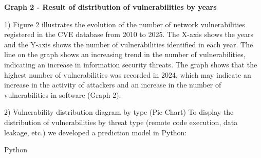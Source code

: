 {\bfseries Graph 2 - Result of distribution of vulnerabilities by years}

1) Figure 2 illustrates the evolution of the number of network
vulnerabilities registered in the CVE database from 2010 to 2025. The
X-axis shows the years and the Y-axis shows the number of
vulnerabilities identified in each year. The line on the graph shows
an increasing trend in the number of vulnerabilities, indicating an
increase in information security threats. The graph shows that the
highest number of vulnerabilities was recorded in 2024, which may
indicate an increase in the activity of attackers and an increase in
the number of vulnerabilities in software (Graph 2).

2) Vulnerability distribution diagram by type (Pie Chart)
To display the distribution of vulnerabilities by threat type (remote
code execution, data leakage, etc.) we developed a prediction model in
Python:

Python

